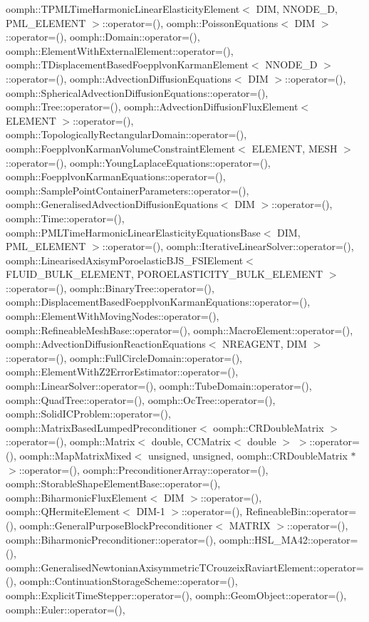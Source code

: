oomph\+::\+T\+P\+M\+L\+Time\+Harmonic\+Linear\+Elasticity\+Element$<$ D\+I\+M, N\+N\+O\+D\+E\+\_\+D, P\+M\+L\+\_\+\+E\+L\+E\+M\+E\+N\+T $>$\+::operator=(), oomph\+::\+Poisson\+Equations$<$ D\+I\+M $>$\+::operator=(), oomph\+::\+Domain\+::operator=(), oomph\+::\+Element\+With\+External\+Element\+::operator=(), oomph\+::\+T\+Displacement\+Based\+Foepplvon\+Karman\+Element$<$ N\+N\+O\+D\+E\+\_\+D $>$\+::operator=(), oomph\+::\+Advection\+Diffusion\+Equations$<$ D\+I\+M $>$\+::operator=(), oomph\+::\+Spherical\+Advection\+Diffusion\+Equations\+::operator=(), oomph\+::\+Tree\+::operator=(), oomph\+::\+Advection\+Diffusion\+Flux\+Element$<$ E\+L\+E\+M\+E\+N\+T $>$\+::operator=(), oomph\+::\+Topologically\+Rectangular\+Domain\+::operator=(), oomph\+::\+Foepplvon\+Karman\+Volume\+Constraint\+Element$<$ E\+L\+E\+M\+E\+N\+T, M\+E\+S\+H $>$\+::operator=(), oomph\+::\+Young\+Laplace\+Equations\+::operator=(), oomph\+::\+Foepplvon\+Karman\+Equations\+::operator=(), oomph\+::\+Sample\+Point\+Container\+Parameters\+::operator=(), oomph\+::\+Generalised\+Advection\+Diffusion\+Equations$<$ D\+I\+M $>$\+::operator=(), oomph\+::\+Time\+::operator=(), oomph\+::\+P\+M\+L\+Time\+Harmonic\+Linear\+Elasticity\+Equations\+Base$<$ D\+I\+M, P\+M\+L\+\_\+\+E\+L\+E\+M\+E\+N\+T $>$\+::operator=(), oomph\+::\+Iterative\+Linear\+Solver\+::operator=(), oomph\+::\+Linearised\+Axisym\+Poroelastic\+B\+J\+S\+\_\+\+F\+S\+I\+Element$<$ F\+L\+U\+I\+D\+\_\+\+B\+U\+L\+K\+\_\+\+E\+L\+E\+M\+E\+N\+T, P\+O\+R\+O\+E\+L\+A\+S\+T\+I\+C\+I\+T\+Y\+\_\+\+B\+U\+L\+K\+\_\+\+E\+L\+E\+M\+E\+N\+T $>$\+::operator=(), oomph\+::\+Binary\+Tree\+::operator=(), oomph\+::\+Displacement\+Based\+Foepplvon\+Karman\+Equations\+::operator=(), oomph\+::\+Element\+With\+Moving\+Nodes\+::operator=(), oomph\+::\+Refineable\+Mesh\+Base\+::operator=(), oomph\+::\+Macro\+Element\+::operator=(), oomph\+::\+Advection\+Diffusion\+Reaction\+Equations$<$ N\+R\+E\+A\+G\+E\+N\+T, D\+I\+M $>$\+::operator=(), oomph\+::\+Full\+Circle\+Domain\+::operator=(), oomph\+::\+Element\+With\+Z2\+Error\+Estimator\+::operator=(), oomph\+::\+Linear\+Solver\+::operator=(), oomph\+::\+Tube\+Domain\+::operator=(), oomph\+::\+Quad\+Tree\+::operator=(), oomph\+::\+Oc\+Tree\+::operator=(), oomph\+::\+Solid\+I\+C\+Problem\+::operator=(), oomph\+::\+Matrix\+Based\+Lumped\+Preconditioner$<$ oomph\+::\+C\+R\+Double\+Matrix $>$\+::operator=(), oomph\+::\+Matrix$<$ double, C\+C\+Matrix$<$ double $>$ $>$\+::operator=(), oomph\+::\+Map\+Matrix\+Mixed$<$ unsigned, unsigned, oomph\+::\+C\+R\+Double\+Matrix $\ast$ $>$\+::operator=(), oomph\+::\+Preconditioner\+Array\+::operator=(), oomph\+::\+Storable\+Shape\+Element\+Base\+::operator=(), oomph\+::\+Biharmonic\+Flux\+Element$<$ D\+I\+M $>$\+::operator=(), oomph\+::\+Q\+Hermite\+Element$<$ D\+I\+M-\/1 $>$\+::operator=(), Refineable\+Bin\+::operator=(), oomph\+::\+General\+Purpose\+Block\+Preconditioner$<$ M\+A\+T\+R\+I\+X $>$\+::operator=(), oomph\+::\+Biharmonic\+Preconditioner\+::operator=(), oomph\+::\+H\+S\+L\+\_\+\+M\+A42\+::operator=(), oomph\+::\+Generalised\+Newtonian\+Axisymmetric\+T\+Crouzeix\+Raviart\+Element\+::operator=(), oomph\+::\+Continuation\+Storage\+Scheme\+::operator=(), oomph\+::\+Explicit\+Time\+Stepper\+::operator=(), oomph\+::\+Geom\+Object\+::operator=(), oomph\+::\+Euler\+::operator=(), 